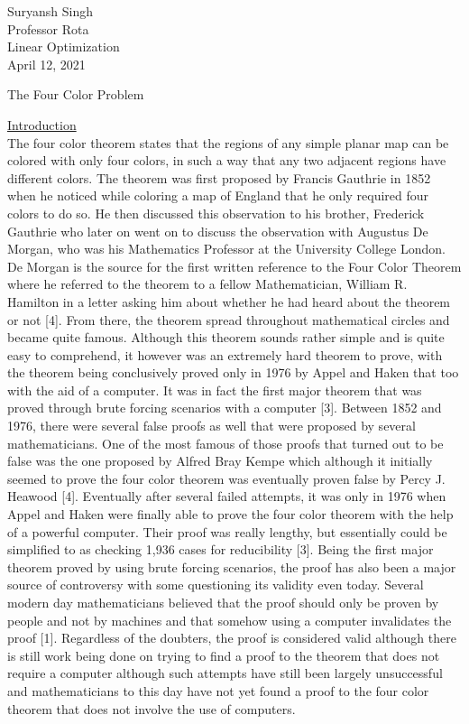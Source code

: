 \documentclass[11pt]{article}
\begin{document}
\rmfamily
 \noindent Suryansh Singh\\ 
Professor Rota\\         
Linear Optimization\\
April 12, 2021 \\ 

\begin{center}
    {\Large The Four Color Problem }
\end{center}

\noindent \underline{Introduction}\\
The four color theorem states that the regions of any simple planar map can be colored with only four colors, in such a way that any two adjacent regions have different colors. The theorem was first proposed by Francis Gauthrie in 1852 when he noticed while coloring a map of England that he only required four colors to do so. He then discussed this observation to his brother, Frederick Gauthrie who later on went on to discuss the observation with Augustus De Morgan, who was his Mathematics Professor at the University College London. De Morgan is the source for the first written reference to the Four Color Theorem where he referred to the theorem to a fellow Mathematician, William R. Hamilton in a letter asking him about whether he had heard about the theorem or not [4]. From there, the theorem spread throughout mathematical circles and became quite famous. Although this theorem sounds rather simple and is quite easy to comprehend, it however was an extremely hard theorem to prove, with the theorem being conclusively proved only in 1976 by Appel and Haken that too with the aid of a computer. It was in fact the first major theorem that was proved through brute forcing scenarios with a computer [3].  Between 1852 and 1976, there were several false proofs as well that were proposed by several mathematicians. One of the most famous of those proofs that turned out to be false was the one proposed by Alfred Bray Kempe which although it initially seemed to prove the four color theorem was eventually proven false by Percy J. Heawood [4]. Eventually after several failed attempts, it was only in 1976 when Appel and Haken were finally able to prove the four color theorem with the help of a powerful computer. Their proof was really lengthy, but essentially could be simplified to as checking 1,936 cases for reducibility [3]. Being the first major theorem proved by using brute forcing scenarios, the proof has also been a major source of controversy with some questioning its validity even today. Several modern day mathematicians believed that the proof should only be proven by people and not by machines and that somehow using a computer invalidates the proof [1]. Regardless of the doubters, the proof is considered valid although there is still work being done on trying to find a proof to the theorem that does not require a computer although such attempts have still been largely unsuccessful and mathematicians to this day have not yet found a proof to the four color theorem that does not involve the use of computers. \\
\end{document}
